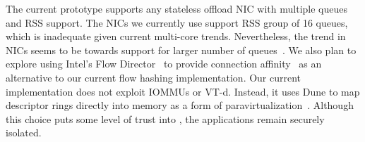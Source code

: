 

 The current prototype
supports any stateless offload NIC with multiple queues and RSS
support. The NICs we currently use support RSS group of 16 queues,
which is inadequate given current multi-core trends. Nevertheless, the
trend in NICs seems to be towards support for larger number of
queues~\cite{radhakrishnan2014senic}. We also plan to explore using Intel's Flow
Director~\cite{intel:82599} to provide connection
affinity~\cite{DBLP:conf/eurosys/PesterevSZM12} as an alternative to
our current flow hashing implementation. Our current implementation
does not exploit IOMMUs or VT-d. Instead, it uses Dune to map
descriptor rings directly into \ix memory as a form of
paravirtualization~\cite{DBLP:conf/sosp/BarhamDFHHHN03}.  Although
this choice puts some level of trust into \ix, the applications remain
securely isolated. %

